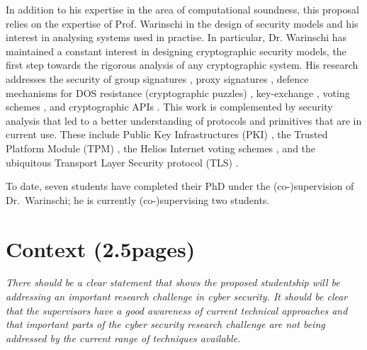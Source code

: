 \documentclass[10pt]{article}
\begin{document}
In addition to his expertise in the area of computational soundness, this proposal relies on the expertise of Prof. Warinschi in the design of security models and his interest in analysing systems used in practise.
In particular, Dr. Warinschi has maintained a constant interest in designing cryptographic security models, the first step towards the rigorous analysis of any cryptographic system. 
His research addresses the security of group signatures \cite{BMW03}, proxy signatures \cite{proxies}, defence mechanisms for DOS resistance (cryptographic puzzles) \cite{puzzles},  key-exchange \cite{ke}, voting schemes \cite{helios}, and cryptographic APIs \cite{KSW11}.
This work is complemented by security analysis that led to a better understanding of protocols and primitives that are in current use.  These include Public Key Infrastructures (PKI) \cite{boldyreva07acloser}, the Trusted Platform Module (TPM) \cite{pcas}, the Helios Internet voting schemes \cite{helios}, and the ubiquitous Transport Layer Security protocol (TLS) \cite{tls}. 



To date, seven students have completed their PhD under the (co-)supervision of Dr.~Warinschi; he is currently (co-)supervising two 
students.


\section{Context (2.5pages)}
\emph{There should be a clear statement that shows the proposed studentship will be addressing an important research challenge in cyber security. It should be clear that the supervisors have a good awareness of current technical approaches and that important parts of the cyber security research challenge are not being addressed by the current range of techniques available.}
\end{document}
